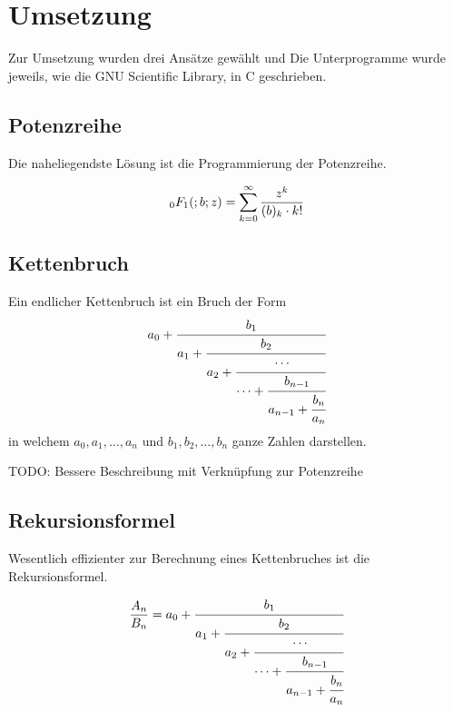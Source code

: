 %
%
%
\section{Umsetzung
\label{0f1:section:teil2}}
Zur Umsetzung wurden drei Ansätze gewählt und 
Die Unterprogramme wurde jeweils, wie die GNU Scientific Library, in C geschrieben.

\subsection{Potenzreihe
\label{0f1:subsection:potenzreihe}}
Die naheliegendste Lösung ist die Programmierung der Potenzreihe.

\begin{equation}
    \label{0f1:rekursion:hypergeometrisch:eq}
    \mathstrut_0F_1(;b;z)
    =
    \sum_{k=0}^\infty
    \frac{z^k}{(b)_k \cdot k!}
\end{equation}



\subsection{Kettenbruch
\label{0f1:subsection:kettenbruch}}
Ein endlicher Kettenbruch ist ein Bruch der Form
\begin{equation}
a_0 + \cfrac{b_1}{a_1+\cfrac{b_2}{a_2+\cfrac{\cdots}{\cdots+\cfrac{b_{n-1}}{a_{n-1} + \cfrac{b_n}{a_n}}}}}
\end{equation}
in welchem $a_0, a_1,\dots,a_n$ und $b_1,b_2,\dots,b_n$ ganze Zahlen
darstellen.

{\color{red}TODO: Bessere Beschreibung mit Verknüpfung zur Potenzreihe}



\subsection{Rekursionsformel
\label{0f1:subsection:rekursionsformel}}
Wesentlich effizienter zur Berechnung eines Kettenbruches ist die Rekursionsformel.

\begin{align*}
\frac{A_n}{B_n}
=
a_0 + \cfrac{b_1}{a_1+\cfrac{b_2}{a_2+\cfrac{\cdots}{\cdots+\cfrac{b_{n-1}}{a_{n-1} + \cfrac{b_n}{a_n}}}}}
\end{align*}

